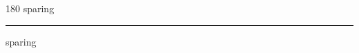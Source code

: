 
\begin{frame}
\begin{center}
\begin{turn}{180}
{\fontsize{2.5cm}{1em}\selectfont sparing}
\end{turn}
\vspace{1em}\par  
\hrule
\vspace{1em}\par  
{\fontsize{2.5cm}{1em}\selectfont sparing}
\end{center}
\end{frame}
